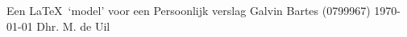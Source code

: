 \documentclass[11pt,a4paper,twoside,dutch]{report}%
\newif\ifpublic \newif\iftwocol %
\begin{document}
\titelblad                   %
  {Een \LaTeX\ `model' voor een Persoonlijk verslag} %
  {Galvin Bartes (0799967)} %
  {\TI}                      %
  {\today}                   %
  {Dhr. M. de Uil}           %
  {}                         %
\ifpublic
  {\footnotesize{}}
\else
  \tableofcontents         %
\fi
\ifpublic
  \iflanguage{dutch}{\def\bibname{\normalsize{Bronnen}}}
                    {\def\bibname{\normalsize{References}}}
  {\footnotesize{}}   %
\else
 
  \appendix
  
\fi
\end{document}
